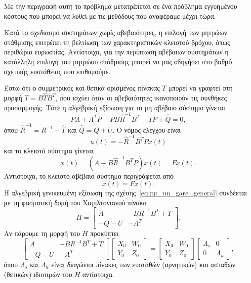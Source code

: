 Με την περιγραφή αυτή το πρόβλημα μετατρέπεται σε ένα πρόβλημα εγγυημένου
κόστους που μπορεί να λυθεί με τις μεθόδους που αναφέραμε μέχρι τώρα.

Κατά το σχεδιασμό συστημάτων χωρίς αβεβαιότητες, η επιλογή των μητρώων
στάθμισης επιτρέπει τη βελτίωση των χαρακτηριστικών κλειστού βρόχου, όπως
περιθώρια ευρωστίας. Αντίστοιχα, για την περίπτωση αβέβαιων συστημάτων η
κατάλληλη επιλογή του μητρώου στάθμισης μπορεί να μας οδηγήσει στο βαθμό
σχετικής ευστάθειας που επιθυμούμε.

Έστω ότι ο συμμετρικός και θετικά ορισμένος πίνακας \( T \) μπορεί να γραφτεί
στη μορφή \( T = B\hat{T}B^T \), που ισχύει όταν οι αβεβαιότητες ικανοποιούν
τις συνθήκες προσαρμογής. Τότε η αλγεβρική εξίσωση  για το μη
αβέβαιο σύστημα γίνεται
\begin{equation}\label{eq:pp_un_wei}
    PA + A^{T}P - PB\hat{R}^{-1}B^{T} - TP + \hat{Q} = 0,
\end{equation}
όπου \( \hat{R}^{-1} = R^{-1} - \hat{T} \) και \( \hat{Q} = Q + U \). Ο νόμος
ελέγχου είναι
\[
    u(t) = -\hat{R}^{-1}B^TPx(t)
\]
και το κλειστό σύστημα γίνεται
\begin{equation}\label{eq:pp_closed}
    \dot{x}(t) = (A - B\hat{R}^{-1}B^TP)x(t) = Fx(t).
\end{equation}
Αντίστοιχα, το κλειστό αβέβαιο σύστημα περιγράφεται από
\[
    \dot{x}(t) = Fx(t).
\]
Η αλγεβρική γενικευμένη εξίσωση  της σχέσης~\eqref{eq:pp_un_gare_general}
συνδέεται με τη φασματική δομή του Χαμιλτονιανού πίνακα
\begin{equation*}
    H =
    \begin{bmatrix}
        A & -BR^{-1}B^T + T \\
        -Q - U & -A^T
    \end{bmatrix}.
\end{equation*}
Αν πάρουμε τη μορφή  του \( H \) προκύπτει
\begin{equation}\label{eq:pp_hamil}
    \begin{bmatrix}
        A & -BR^{-1}B^T + T \\
        -Q - U & -A^T
    \end{bmatrix}
    \begin{bmatrix}
        X_0 & W_0 \\
        Y_0 & Z_0
    \end{bmatrix} =
    \begin{bmatrix}
        X_0 & W_0 \\
        Y_0 & Z_0
    \end{bmatrix}
    \begin{bmatrix}
        \Lambda_s & 0 \\
        0 & \Lambda_u
    \end{bmatrix},
\end{equation}
όπου \( \Lambda_s \) και \( \Lambda_u \) είναι διαγώνιοι πίνακες των ευσταθών
(αρνητικών) και ασταθών (θετικών) ιδιοτιμών του \( H \) αντίστοιχα.

